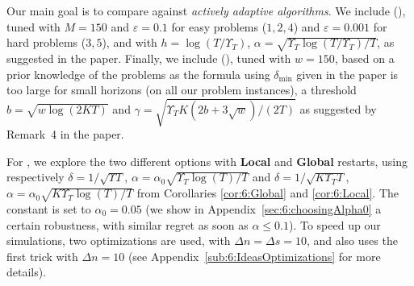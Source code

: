 

Our main goal is to compare against \emph{actively adaptive algorithms}. We  include \CUSUMklUCB{} (\cite{LiuLeeShroff17}), tuned with $M=150$ and $\varepsilon=0.1$ for easy problems ($1,2,4$) and $\varepsilon=0.001$ for hard problems ($3,5$),
and with $h = \log(T/\Upsilon_T)$, $\alpha = \sqrt{\Upsilon_T \log(T/\Upsilon_T) / T}$, as suggested in the paper.
%
Finally, we include \MklUCB{} (\cite{CaoZhenKvetonXie18}),
tuned with $w=150$, based on a prior knowledge of the problems as the formula using $\delta_{\min}$ given in the paper is too large for small horizons (on all our problem instances), a threshold $b=\sqrt{w \log(2 K T)}$ and $\gamma=\sqrt{\Upsilon_T K (2 b + 3 \sqrt{w}) / (2 T)}$ as suggested by Remark~4 in the paper.


For \GLRklUCB, we explore the two different options with \textbf{Local} and \textbf{Global} restarts,
using respectively
$\delta = 1/\sqrt{\Upsilon T}$, $\alpha = \alpha_0 \sqrt{\Upsilon_T \log(T) /T}$
and
$\delta = 1/\sqrt{K \Upsilon_T T}$, $\alpha = \alpha_0\sqrt{K \Upsilon_T \log(T) / T}$
from Corollaries \ref{cor:6:Global} and \ref{cor:6:Local}.
The constant is set to $\alpha_0 = 0.05$
(we show in Appendix~\ref{sec:6:choosingAlpha0} a certain robustness, with similar regret as soon as $\alpha\leq0.1$).
%
To speed up our simulations, two optimizations are used, with $\Delta n = \Delta s = 10$,
and \CUSUM{} also uses the first trick with $\Delta n = 10$ (see Appendix~\ref{sub:6:IdeasOptimizations} for more details).

%

